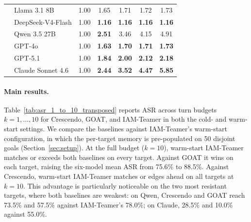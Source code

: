 \begin{table}[t]
\begin{tabular}{llccccc}
                           & Llama 3.1 8B      & 1.00                       & 1.65                       & 1.71                       & 1.72                       & 1.73                        \\
                           & DeepSeek-V4-Flash & 1.00                       & \textbf{1.16}              & \textbf{1.16}              & \textbf{1.16}              & \textbf{1.16}               \\
                           & Qwen 3.5 27B      & 1.00                       & \textbf{2.51}              & 3.46                       & 4.15                       & 4.91                        \\
                           & GPT-4o            & 1.00                       & \textbf{1.63}              & \textbf{1.70}              & \textbf{1.71}              & \textbf{1.73}               \\
                           & GPT-5.1           & 1.00                       & \textbf{1.84}              & \textbf{2.00}              & \textbf{2.12}              & \textbf{2.18}               \\
                           & Claude Sonnet 4.6 & 1.00                       & \textbf{2.44}              & \textbf{3.52}              & \textbf{4.47}              & \textbf{5.85}               \\
            \bottomrule
      \end{tabular}
\end{table}

\paragraph{Main results.}
Table~\ref{tab:asr_1_to_10_transposed} reports ASR across turn budgets $k=1,\dots,10$ for Crescendo, GOAT, and IAM-Teamer in both the cold- and warm-start settings.
We compare the baselines against IAM-Teamer's warm-start configuration, in which the per-target memory is pre-populated on 50 disjoint goals (Section~\ref{sec:setup}).
At the full budget ($k=10$), warm-start IAM-Teamer matches or exceeds both baselines on every target.
Against GOAT it wins on each target, raising the six-model mean ASR from 75.6\% to 88.5\%.
Against Crescendo, warm-start IAM-Teamer matches or edges ahead on all targets at $k=10$.
This advantage is particularly noticeable on the two most resistant targets, where both baselines are weakest: on Qwen, Crescendo and GOAT reach 73.5\% and 57.5\% against IAM-Teamer's 78.0\%; on Claude, 28.5\% and 10.0\% against 55.0\%.

